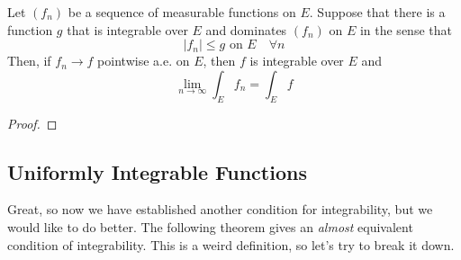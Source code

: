  \begin{theorem}
    
  \end{theorem}

  \begin{theorem}
    Let $(f_n)$ be a sequence of measurable functions on $E$. Suppose that there is a function $g$ that is integrable over $E$ and dominates $(f_n)$ on $E$ in the sense that 
    \begin{equation}
      |f_n| \leq g \text{ on } E \quad \forall n
    \end{equation}
    Then, if $f_n \to f$ pointwise a.e. on $E$, then $f$ is integrable over $E$ and 
    \begin{equation}
      \lim_{n \to \infty} \int_E f_n = \int_E f
    \end{equation}
  \end{theorem}
  \begin{proof}
    
  \end{proof}

\subsection{Uniformly Integrable Functions} 

  Great, so now we have established another condition for integrability, but we would like to do better. The following theorem gives an \textit{almost} equivalent condition of integrability. This is a weird definition, so let's try to break it down. 


